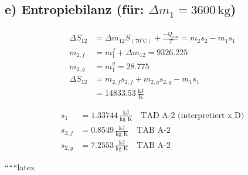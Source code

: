 \subsection*{e) Entropiebilanz (für: \(\Delta m_{1} = 3600 \, \text{kg}\))}

\begin{align*}
\Delta S_{12} &= \Delta m_{12} S_{(70^\circ \text{C})} + \frac{-\dot{Q}_{\text{aus}}}{T} = m_{2} s_{2} - m_{1} s_{1} \\
m_{2,f} &= m_{1}^{f} + \Delta m_{12} = 9326.225 \\
m_{2,g} &= m_{1}^{g} = 28.775 \\
\Delta S_{12} &= m_{2,f} s_{2,f} + m_{2,g} s_{2,g} - m_{1} s_{1} \\
&= 14833.53 \, \frac{\text{kJ}}{\text{K}}
\end{align*}

\begin{align*}
s_{1} &= 1.33744 \, \frac{\text{kJ}}{\text{kg K}} \quad \text{TAD A-2 (interpretiert x_{D})} \\
s_{2,f} &= 0.8549 \, \frac{\text{kJ}}{\text{kg K}} \quad \text{TAB A-2} \\
s_{2,g} &= 7.2553 \, \frac{\text{kJ}}{\text{kg K}} \quad \text{TAB A-2}
\end{align*}

``````latex